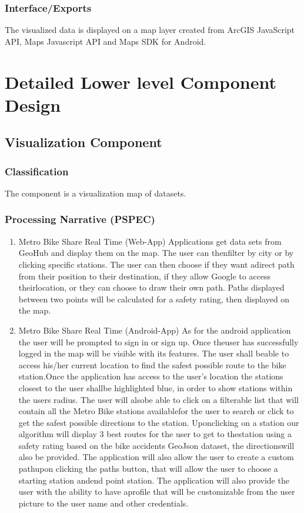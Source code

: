 \documentclass[a4paper,12pt]{article}
\begin{document}
    \subsubsection{Interface/Exports}
        The visualized data is displayed on a map layer created from ArcGIS JavaScript API, Maps Javascript API and Maps SDK for Android.
\section{Detailed Lower level Component Design}
    \subsection{Visualization Component}
    \subsubsection{Classification}
        The component is a visualization map of datasets.
    \subsubsection{Processing Narrative (PSPEC)}
        \begin{enumerate}
            \item Metro Bike Share Real Time (Web-App)
            Applications get data sets from GeoHub and display them on the map. The user can thenfilter by city or by clicking specific stations. The user can then choose if they want adirect path from their position to their destination, if they allow Google to access theirlocation, or they can choose to draw their own path. Paths displayed between two points will be calculated for a safety rating, then displayed on the map.
            \item Metro Bike Share Real Time (Android-App)
            As for the android application the user will be prompted to sign in or sign up. Once theuser has successfully logged in the map will be visible with its features. The user shall beable to access his/her current location to find the safest possible route to the bike station.Once the application has access to the user’s location the stations closest to the user shallbe highlighted blue, in order to show stations within the users radius. The user will alsobe able to click on a filterable list that will contain all the Metro Bike stations availablefor the user to search or click to get the safest possible directions to the station. Uponclicking on a station our algorithm will display 3 best routes for the user to get to thestation using a safety rating based on the bike accidents GeoJson dataset, the directionswill also be provided. The application will also allow the user to create a custom pathupon clicking the paths button, that will allow the user to choose a starting station andend point station. The application will also provide the user with the ability to have aprofile that will be customizable from the user picture to the user name and other credentials.
        \end{enumerate}
\end{document}
